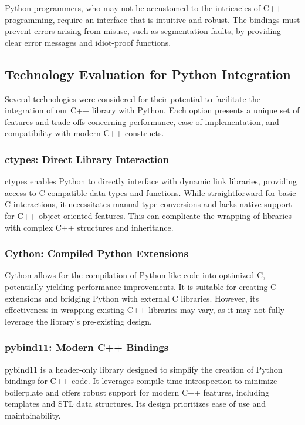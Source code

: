Python programmers, who may not be accustomed to the intricacies of C++ programming, require an interface that is intuitive and robust. The bindings must prevent errors arising from misuse, such as segmentation faults, by providing clear error messages and idiot-proof functions.

\subsection{Technology Evaluation for Python Integration}

Several technologies were considered for their potential to facilitate the integration of our C++ library with Python. Each option presents a unique set of features and trade-offs concerning performance, ease of implementation, and compatibility with modern C++ constructs.

\subsubsection{ctypes: Direct Library Interaction}

ctypes enables Python to directly interface with dynamic link libraries, providing access to C-compatible data types and functions. While straightforward for basic C interactions, it necessitates manual type conversions and lacks native support for C++ object-oriented features. This can complicate the wrapping of libraries with complex C++ structures and inheritance.

\subsubsection{Cython: Compiled Python Extensions}

Cython allows for the compilation of Python-like code into optimized C, potentially yielding performance improvements. It is suitable for creating C extensions and bridging Python with external C libraries. However, its effectiveness in wrapping existing C++ libraries may vary, as it may not fully leverage the library's pre-existing design.

\subsubsection{pybind11: Modern C++ Bindings}

pybind11 is a header-only library designed to simplify the creation of Python bindings for C++ code. It leverages compile-time introspection to minimize boilerplate and offers robust support for modern C++ features, including templates and STL data structures. Its design prioritizes ease of use and maintainability.


